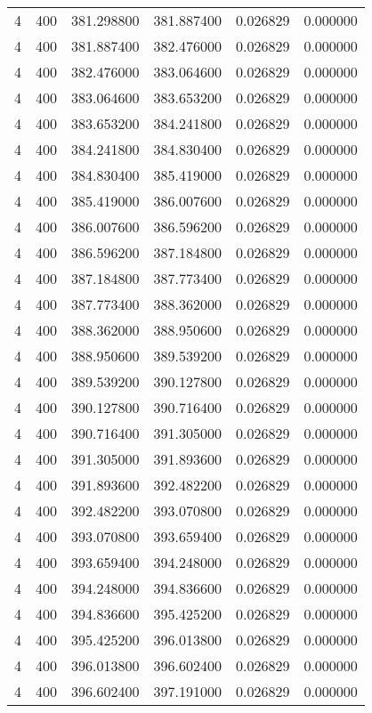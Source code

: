 \begin{longtable}{rrrrrr}
4 & 400 & 381.298800 & 381.887400 & 0.026829 & 0.000000 \\
4 & 400 & 381.887400 & 382.476000 & 0.026829 & 0.000000 \\
4 & 400 & 382.476000 & 383.064600 & 0.026829 & 0.000000 \\
4 & 400 & 383.064600 & 383.653200 & 0.026829 & 0.000000 \\
4 & 400 & 383.653200 & 384.241800 & 0.026829 & 0.000000 \\
4 & 400 & 384.241800 & 384.830400 & 0.026829 & 0.000000 \\
4 & 400 & 384.830400 & 385.419000 & 0.026829 & 0.000000 \\
4 & 400 & 385.419000 & 386.007600 & 0.026829 & 0.000000 \\
4 & 400 & 386.007600 & 386.596200 & 0.026829 & 0.000000 \\
4 & 400 & 386.596200 & 387.184800 & 0.026829 & 0.000000 \\
4 & 400 & 387.184800 & 387.773400 & 0.026829 & 0.000000 \\
4 & 400 & 387.773400 & 388.362000 & 0.026829 & 0.000000 \\
4 & 400 & 388.362000 & 388.950600 & 0.026829 & 0.000000 \\
4 & 400 & 388.950600 & 389.539200 & 0.026829 & 0.000000 \\
4 & 400 & 389.539200 & 390.127800 & 0.026829 & 0.000000 \\
4 & 400 & 390.127800 & 390.716400 & 0.026829 & 0.000000 \\
4 & 400 & 390.716400 & 391.305000 & 0.026829 & 0.000000 \\
4 & 400 & 391.305000 & 391.893600 & 0.026829 & 0.000000 \\
4 & 400 & 391.893600 & 392.482200 & 0.026829 & 0.000000 \\
4 & 400 & 392.482200 & 393.070800 & 0.026829 & 0.000000 \\
4 & 400 & 393.070800 & 393.659400 & 0.026829 & 0.000000 \\
4 & 400 & 393.659400 & 394.248000 & 0.026829 & 0.000000 \\
4 & 400 & 394.248000 & 394.836600 & 0.026829 & 0.000000 \\
4 & 400 & 394.836600 & 395.425200 & 0.026829 & 0.000000 \\
4 & 400 & 395.425200 & 396.013800 & 0.026829 & 0.000000 \\
4 & 400 & 396.013800 & 396.602400 & 0.026829 & 0.000000 \\
4 & 400 & 396.602400 & 397.191000 & 0.026829 & 0.000000 \\

\end{longtable}
